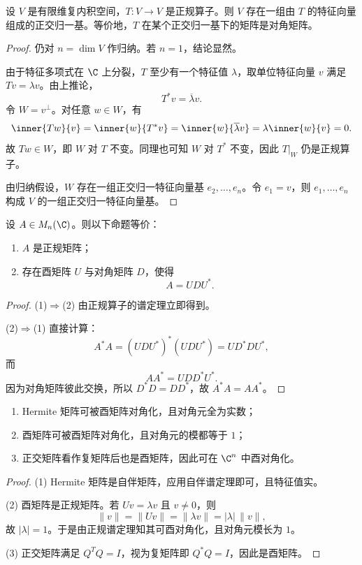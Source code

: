 \begin{theorem}[正规算子的谱定理]
设 $V$ 是有限维复内积空间，$T:V\to V$ 是正规算子。则 $V$ 存在一组由 $T$ 的特征向量组成的正交归一基。等价地，$T$ 在某个正交归一基下的矩阵是对角矩阵。
\end{theorem}

\begin{proof}
仍对 $n=\dim V$ 作归纳。若 $n=1$，结论显然。

由于特征多项式在 $\C$ 上分裂，$T$ 至少有一个特征值 $\lambda$，取单位特征向量 $v$ 满足 $Tv=\lambda v$。由上推论，
\[
T^*v=\overline{\lambda}v.
\]
令 $W=v^{\perp}$。对任意 $w\in W$，有
\[
\inner{Tw}{v}=\inner{w}{T^*v}=\inner{w}{\overline{\lambda}v}=\lambda\inner{w}{v}=0.
\]
故 $Tw\in W$，即 $W$ 对 $T$ 不变。同理也可知 $W$ 对 $T^*$ 不变，因此 $T|_W$ 仍是正规算子。

由归纳假设，$W$ 存在一组正交归一特征向量基 $e_2,\dots,e_n$。令 $e_1=v$，则 $e_1,\dots,e_n$ 构成 $V$ 的一组正交归一特征向量基。
\end{proof}

\begin{corollary}
设 $A\in M_n(\C)$。则以下命题等价：
\begin{enumerate}[label=\textnormal{(\arabic*)}]
  \item $A$ 是正规矩阵；
  \item 存在酉矩阵 $U$ 与对角矩阵 $D$，使得
  \[
  A=UDU^*.
  \]
\end{enumerate}
\end{corollary}

\begin{proof}
(1)$\Rightarrow$(2) 由正规算子的谱定理立即得到。

(2)$\Rightarrow$(1) 直接计算：
\[
A^*A=(UDU^*)^*(UDU^*)=UD^*DU^*,
\]
而
\[
AA^*=UDD^*U^*.
\]
因为对角矩阵彼此交换，所以 $D^*D=DD^*$，故 $A^*A=AA^*$。
\end{proof}

\begin{corollary}
\begin{enumerate}[label=\textnormal{(\arabic*)}]
  \item Hermite 矩阵可被酉矩阵对角化，且对角元全为实数；
  \item 酉矩阵可被酉矩阵对角化，且对角元的模都等于 $1$；
  \item 正交矩阵看作复矩阵后也是酉矩阵，因此可在 $\C^n$ 中酉对角化。
\end{enumerate}
\end{corollary}

\begin{proof}
(1) Hermite 矩阵是自伴矩阵，应用自伴谱定理即可，且特征值实。

(2) 酉矩阵是正规矩阵。若 $Uv=\lambda v$ 且 $v\ne0$，则
\[
\|v\|=\|Uv\|=\|\lambda v\|=|\lambda|\,\|v\|,
\]
故 $|\lambda|=1$。于是由正规谱定理知其可酉对角化，且对角元模长为 $1$。

(3) 正交矩阵满足 $Q^TQ=I$，视为复矩阵即 $Q^*Q=I$，因此是酉矩阵。
\end{proof}

